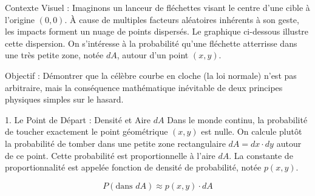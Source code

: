 \begin{proofbox}

Contexte Visuel : Imaginons un lanceur de fléchettes visant le centre d'une cible à l'origine $(0,0)$. À cause de multiples facteurs aléatoires inhérents à son geste, les impacts forment un nuage de points dispersés. Le graphique ci-dessous illustre cette dispersion. On s'intéresse à la probabilité qu'une fléchette atterrisse dans une très petite zone, notée $dA$, autour d'un point $(x,y)$.

\begin{center}
\end{center}

Objectif : Démontrer que la célèbre courbe en cloche (la loi normale) n'est pas arbitraire, mais la conséquence mathématique inévitable de deux principes physiques simples sur le hasard.

1. Le Point de Départ : Densité et Aire $dA$
Dans le monde continu, la probabilité de toucher exactement le point géométrique $(x,y)$ est nulle. On calcule plutôt la probabilité de tomber dans une petite zone rectangulaire $dA = dx \cdot dy$ autour de ce point.
Cette probabilité est proportionnelle à l'aire $dA$. La constante de proportionnalité est appelée fonction de densité de probabilité, notée $p(x,y)$.

$$P(\text{dans } dA) \approx p(x,y) \cdot dA$$



\end{proofbox}
